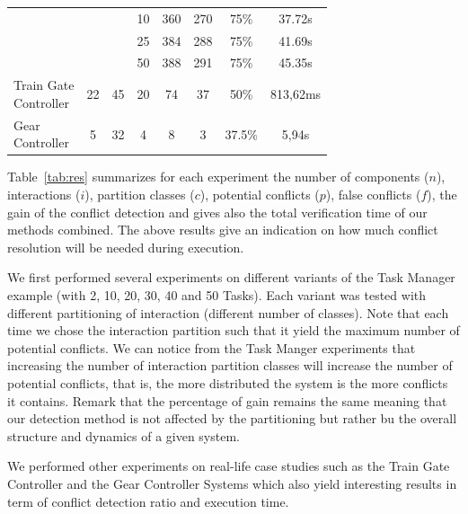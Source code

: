 \begin{table}[H]
\begin{center}
\begin{tabular}{| l || c | c | c | c | c | c | c |}
                                       &                          &                        & 10           & 360   & 270   &  75\%  & 37.72s \\ \cline{4-7}
                                       &                          &                        & 25           & 384   & 288   &  75\%  & 41.69s \\ \cline{4-7}
                                       &                          &                        & 50           & 388   & 291   &  75\%  & 45.35s \\ \cline{4-7}\hline
    \makecell{Train Gate\\Controller}  & 22                       & 45                     & 20           & 74    & 37    &  50\%  & 813,62ms \\ \hline
    \makecell{Gear \\Controller}       & 5                        & 32                     & 4            & 8     & 3     &  37.5\%  & 5,94s \\ \hline

  \end{tabular}
\end{center}
\end{table}
Table~\ref{tab:res} summarizes for each experiment the number of components ($n$), 
interactions ($i$),
partition classes ($c$), potential conflicts ($p$), false conflicts ($f$), the gain of the 
conflict detection 
and gives also the total verification time of our methods combined.
The above results give an indication on how much conflict resolution will be needed during 
execution. 

We first performed several experiments on different variants of the Task Manager example 
(with 2, 10, 20, 30, 40 and 50 Tasks). Each variant was tested with different partitioning of
interaction (different number of classes). Note that each time we chose the interaction
partition such that it yield the maximum number of potential conflicts. 
We can notice from the Task Manger experiments that increasing the number of interaction 
partition classes will increase the number of potential conflicts, that is,
the more distributed the system is the more conflicts it contains. 
Remark  that the percentage of gain remains the same meaning that our detection method
is not affected by the partitioning but rather bu the overall structure and dynamics of 
a given system.

We performed other experiments on real-life case studies such as the Train Gate Controller 
and the Gear Controller Systems which also yield interesting results in term of conflict 
detection ratio and execution time.

